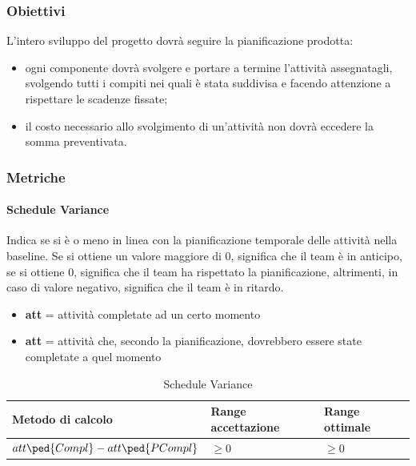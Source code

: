 		\subsubsection{Obiettivi}
		L’intero sviluppo del progetto dovrà seguire la pianificazione prodotta:
		\begin{itemize}
			\item ogni componente dovrà svolgere e portare a termine l'attività assegnatagli, svolgendo tutti i compiti nei quali è stata suddivisa e facendo attenzione a rispettare le scadenze fissate;
			\item il costo necessario allo svolgimento di un'attività non dovrà eccedere la somma
			preventivata.
		\end{itemize}
		\subsubsection{Metriche}
			\paragraph{Schedule Variance}
			Indica se si è o meno in linea con la pianificazione temporale delle attività nella baseline.
			Se si ottiene un valore maggiore di 0, significa che il team è in anticipo, se si ottiene 0, significa che il team ha rispettato la pianificazione, altrimenti, in caso di valore negativo, significa che il team è in ritardo.
			
				\begin{itemize}
				\item \textbf{att} = attività completate ad un certo momento
				\item \textbf{att} = attività che, secondo la pianificazione, dovrebbero essere state completate a quel momento
			\end{itemize}
			
			\begin{table}[H]
				\begin{longtable}{>{\centering\arraybackslash}p{5cm}|>{\centering\arraybackslash}p{5cm} | >{\centering\arraybackslash}p{5cm}}
					\hline
					\rowcolor{Gray}
					\textbf{Metodo di calcolo} & \textbf{Range accettazione} & \textbf{Range ottimale} \\
					\hline
					\begin{math}
					{att\ped{Compl} - att\ped{PCompl}}
					\end{math}  &  \begin{math}\geq{0} \end{math}  &  \begin{math}\geq{0} \end{math} 
				\end{longtable}
				\caption{Schedule Variance}
			\end{table}
		
